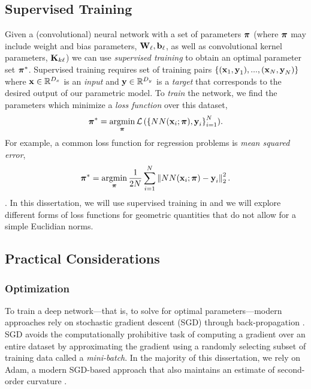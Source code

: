 \subsection{Supervised Training}
Given a (convolutional) neural network with a set of parameters $\boldsymbol{\mathbf{\pi}}$ (where $\boldsymbol{\mathbf{\pi}}$ may include weight and bias parameters, $\boldsymbol{\mathbf{W}}_\ell, \boldsymbol{\mathbf{b}}_\ell$, as well as convolutional kernel parameters, $\boldsymbol{\mathbf{K}}_{k\ell}$) we can use \textit{supervised training} to obtain an optimal parameter set $\boldsymbol{\mathbf{\pi}}^*$. Supervised training requires  set of training pairs $\{(\boldsymbol{\mathbf{x}}_1, \boldsymbol{\mathbf{y}}_1),...,(\boldsymbol{\mathbf{x}}_N, \boldsymbol{\mathbf{y}}_N) \}$ where $\boldsymbol{\mathbf{x}} \in \mathbb{R}^{D_x}$ is an \textit{input} and $\boldsymbol{\mathbf{y}} \in \mathbb{R}^{D_y}$ is a \textit{target} that corresponds to the desired output of our parametric model. To \textit{train} the network, we find the parameters which minimize a \textit{loss function} over this dataset,
\begin{equation}
\label{eq:math_nn_loss}
\boldsymbol{\mathbf{\pi}}^* = \operatorname*{argmin}_{\boldsymbol{\mathbf{\pi}}} \mathcal{L}\left(\{NN(\boldsymbol{\mathbf{x}}_i; \boldsymbol{\mathbf{\pi}}), \boldsymbol{\mathbf{y}}_i\right\}_{i=1}^N).
\end{equation}
For example, a common loss function for regression problems is \textit{mean squared error},
\begin{equation}
\boldsymbol{\mathbf{\pi}}^* = \operatorname*{argmin}_{\boldsymbol{\mathbf{\pi}}} \frac{1}{2N}\sum_{i=1}^N\left\Vert NN(\boldsymbol{\mathbf{x}}_i; \boldsymbol{\mathbf{\pi}}) - \boldsymbol{\mathbf{y}}_i\right\Vert_2^2.
\end{equation}.
In this dissertation, we will use supervised training in  and we will explore different forms of loss functions for geometric quantities that do not allow for a simple Euclidian norms. 
\subsection{Practical Considerations}
\label{section:math_dl_practical}
\subsubsection{Optimization}

To train a deep network---that is, to solve  for optimal parameters---modern approaches rely on stochastic gradient descent (SGD) through back-propagation \citep{LeCun2015-qf}. SGD avoids the computationally prohibitive task of computing a gradient over an entire dataset by approximating the gradient using a randomly selecting subset of training data called a \textit{mini-batch}. In the majority of this dissertation, we rely on Adam, a modern SGD-based approach that also maintains an estimate of second-order curvature \citep{kingma_adam_2017}.

